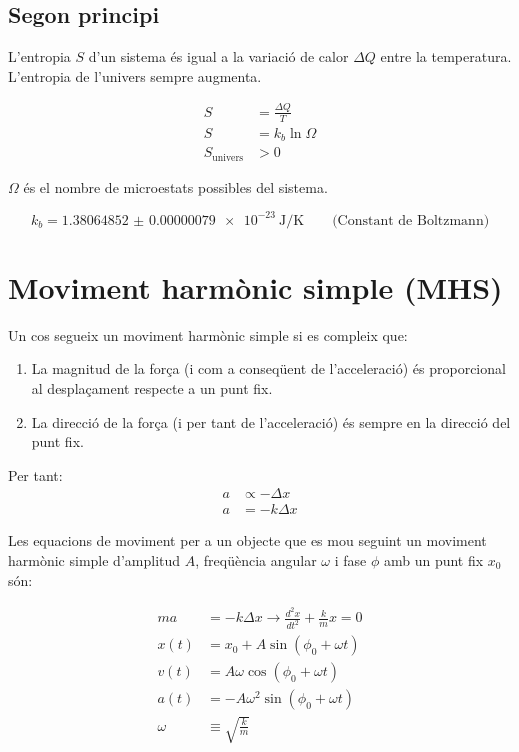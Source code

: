 \subsection{Segon principi}
\label{sub:segon_principi}

L'entropia $S$ d'un sistema és igual a la variació de calor $\Delta Q$ entre la
temperatura. L'entropia de l'univers sempre augmenta.

\begin{align}
    S &= \frac{\Delta Q}{T} \\
    S &= k_b \ln \Omega \\
    S_\text{univers} &> 0
\end{align}

$\Omega$ és el nombre de microestats possibles del sistema.

\begin{equation}
    k_b =  \SI{1.38064852(79)e-23}{\joule\per\kelvin} \qquad \text{(Constant de Boltzmann)}
\end{equation}

\section{Moviment harmònic simple (MHS)}
\label{sec:moviment_harmonic_simple}

Un cos segueix un moviment harmònic simple si es compleix que:
\begin{enumerate}
    \item La magnitud de la força (i com a conseqüent de l'acceleració)
        és proporcional al desplaçament respecte a un punt fix.
    \item La direcció de la força (i per tant de l'acceleració) és sempre en la
        direcció del punt fix.
\end{enumerate}
Per tant:
\begin{align}
    a &\propto -\Delta x\\
    a &= -k\Delta x
\end{align}

Les equacions de moviment per a un objecte que es mou seguint un moviment harmònic simple d'amplitud $A$, freqüència angular $\omega$ i fase $\phi$ amb un punt fix $x_0$són:

\begin{align}
    ma &= -k\Delta x \longrightarrow \frac{d^2x}{dt^2} + \frac{k}{m}x = 0 \nonumber \\
    x(t) &= x_0 + A\sin(\phi_0+\omega t) \\
    v(t) &= A\omega\cos(\phi_0+\omega t) \\
    a(t) &= -A\omega^2\sin(\phi_0+\omega t) \\
    \omega &\equiv \sqrt{\frac{k}{m}}
\end{align}

